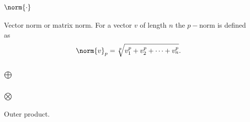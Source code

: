 \subsection*{$\norm{\cdot}$}
Vector norm or matrix norm. For a vector $v$ of length $n$ the $p-$norm is defined as
\begin{equation}
  \norm{v}_{p} = \sqrt[p]{v_{1}^{p}+v_{2}^{p}+\dots+v_{n}^{p}}.
\end{equation}

\subsection*{$\oplus$}

\subsection*{$\otimes$}
Outer product.

\endinput
